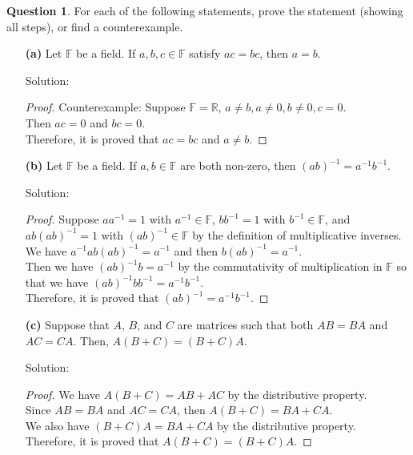 \documentclass{article}
\newcommand{\R}{\mathbb{R}}
\newcommand{\F}{\mathbb{F}}
\theoremstyle{definition}
\newtheorem{question}{Question}
\begin{document}
\begin{question} For each of the following statements, prove the statement (showing all steps), or find a counterexample.

\vspace{.25cm}

\begin{enumerate}

\item[{\bf (a)}] Let $\F$ be a field. If $a,b,c \in \F$ satisfy $ac = bc$, then $a = b$.

Solution:
\begin{proof}
    Counterexample: Suppose \(\F = \R\), \(a \neq b, a \neq 0, b \neq 0, c = 0\). \\ Then \(ac = 0\) and \(bc = 0\). \\ Therefore, it is proved that \(ac = bc\) and \( a\neq b\).
\end{proof}

\vspace{.25cm}

\item[{\bf (b)}] Let $\F$ be a field. If $a,b \in \F$ are both non-zero, then $(ab)^{-1} = a^{-1}b^{-1}$.

Solution:
\begin{proof}
    Suppose \(aa^{-1}=1\) with \(a^{-1}\in\F\), \(bb^{-1}=1\) with \(b^{-1}\in\F\), and \(ab(ab)^{-1}=1\) with \((ab)^{-1}\in\F\) by the definition of multiplicative inverses. \\ We have \(a^{-1}ab(ab)^{-1}=a^{-1}\) and then \(b(ab)^{-1}=a^{-1}\). \\ Then we have \((ab)^{-1}b=a^{-1}\) by the commutativity of multiplication in \(\F\) so that we have \((ab)^{-1}bb^{-1}=a^{-1}b^{-1}\). \\ Therefore, it is proved that \((ab)^{-1}=a^{-1}b^{-1}\).
\end{proof}

\vspace{.25cm}

\item[{\bf (c)}] Suppose that $A$, $B$, and $C$ are matrices such that both $AB = BA$ and $AC = CA$. Then, $A(B+C) = (B+C)A$.

Solution:
\begin{proof}
    We have \(A(B+C) = AB + AC\) by the distributive property. \\ Since \(AB=BA\) and \(AC=CA\), then \(A(B+C)= BA + CA\). \\ We also have \((B+C)A = BA + CA\) by the distributive property. \\ Therefore, it is proved that \(A(B+C) = (B+C)A\).
\end{proof}


\end{enumerate}
\end{question}
\end{document}
